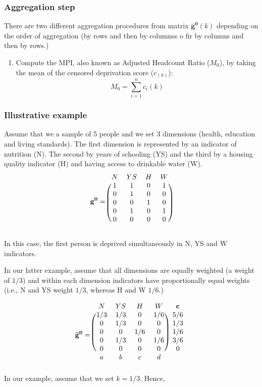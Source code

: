 \hypertarget{aggregation-step}{%
\subsubsection{Aggregation step}\label{aggregation-step}}

There are two different aggregation procedures from matrix \(\mathbf{\bar{g}^0}(k)\) depending on the order of aggregation (by rows and then by columnss o fir by columns and then by rows.)

\begin{enumerate}
\item Compute the MPI, also known as Adjusted Headcount Ratio ($M_0$), by taking the mean of the censored deprivation score ($c_(k)$):
\[M_0 = \sum_{i=1}^n c_i(k) \]
\end{enumerate}

\hypertarget{illustrative-example}{%
\subsubsection{Illustrative example}\label{illustrative-example}}

Assume that we a sample of 5 people and we set 3 dimensions (health, education and living standards). The first dimension is represented by an indicator of nutrition (N). The second by years of schooling (YS) and the third by a housing quality indicator (H) and having access to drinkable water (W).
\[ \mathbf{g^0} = 
\begin{blockarray}{cccc}
N & YS & H & W \\
\begin{block}{(cccc)}
  1 & 1 & 0 & 1 \\
  0 & 1 & 0 & 0 \\
  0 & 0 & 1 & 0 \\
  0 & 1 & 0 & 1 \\
  0 & 0 & 0 & 0 \\
\end{block}
\end{blockarray}
\]

In this case, the first person is deprived simultaneously in N, YS and W indicators.

In our latter example, assume that all dimensions are equally weighted (a weight of \(1/3\)) and within each dimension indicators have proportionally equal weights (i.e., N and YS weight \(1/3\), whereas H and W \(1/6\).)

\[ \mathbf{\bar{g}^0} = 
\begin{blockarray}{ccccc}
N & YS & H & W & \bf{c}\\
\begin{block}{(cccc)c}
  1/3 & 1/3 & 0 & 1/6 & 5/6\\
  0 & 1/3 & 0 & 0 & 1/3\\
  0 & 0 & 1/6 & 0 & 1/6\\
  0 & 1/3 & 0 & 1/6 & 3/6\\
  0 & 0 & 0 & 0 & 0\\
\end{block}
  a & b & c & d & 
\end{blockarray}
\]
In our example, assume that we set \(k = 1/3\). Hence,

